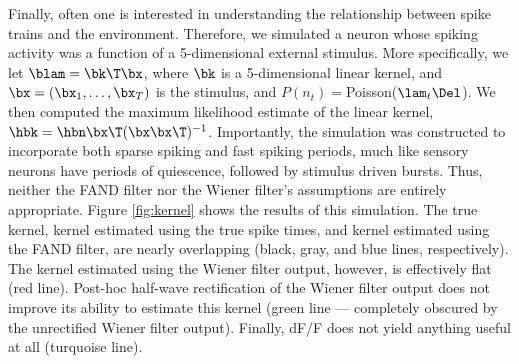 % 
% 
% 

Finally, often one is interested in understanding the relationship between spike trains and the environment.  Therefore, we simulated a neuron whose spiking activity was a function of a 5-dimensional external stimulus.  More specifically, we let $\blam = \bk\T \bx$, where $\bk$ is a 5-dimensional linear kernel, and $\bx = (\bx_1, \ldots, \bx_T)$ is the stimulus, and $P(n_t)=$Poisson($\lam_t \Del$).  We then computed the maximum likelihood estimate of the linear kernel, $\hbk=\hbn \bx\T (\bx \bx\T)^{-1}$.  Importantly, the simulation was constructed to incorporate both sparse spiking and fast spiking periods, much like sensory neurons have periods of quiescence, followed by stimulus driven bursts.  Thus, neither the FAND filter nor the Wiener filter's assumptions are entirely appropriate. Figure \ref{fig:kernel} shows the results of this simulation.  The true kernel, kernel estimated using the true spike times, and kernel estimated using the FAND filter, are nearly overlapping (black, gray, and blue lines, respectively).  The kernel estimated using the Wiener filter output, however, is effectively flat (red line). Post-hoc half-wave rectification of the Wiener filter output does not improve its ability to estimate this kernel (green line --- completely obscured by the unrectified Wiener filter output).  Finally, dF/F does not yield anything useful at all (turquoise line).  

